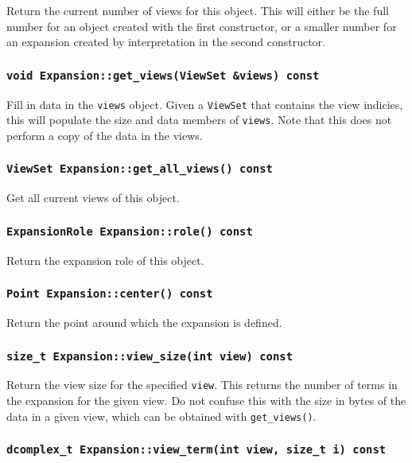 Return the current number of views for this object. This will either be the
full number for an object created with the first constructor, or a smaller
number for an expansion created by interpretation in the second constructor.

\subsubsection{\texttt{void Expansion::get\_views(ViewSet \&views) const}}

Fill in data in the \texttt{views} object. Given a \texttt{ViewSet} that
contains the view indicies, this will populate the size and data members of
\texttt{views}. Note that this does not perform a copy of the data in the
views.

\subsubsection{\texttt{ViewSet Expansion::get\_all\_views() const}}

Get all current views of this object.

\subsubsection{\texttt{ExpansionRole Expansion::role() const}}

Return the expansion role of this object.

\subsubsection{\texttt{Point Expansion::center() const}}

Return the point around which the expansion is defined.

\subsubsection{\texttt{size\_t Expansion::view\_size(int view) const}}

Return the view size for the specified \texttt{view}. This returns the number
of terms in the expansion for the given view. Do not confuse this with the
size in bytes of the data in a given view, which can be obtained with
\texttt{get\_views()}.

\subsubsection{\texttt{dcomplex\_t Expansion::view\_term(int view, size\_t i) const}}

